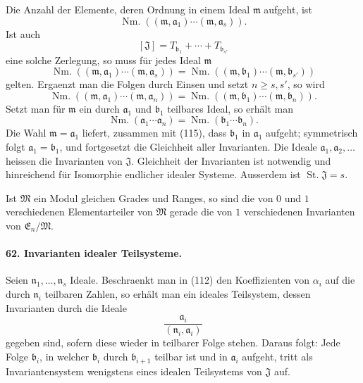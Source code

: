\documentclass[11pt]{article}
\newcommand{\St}{\operatorname{St.}}
\newcommand{\Nm}{\operatorname{Nm.}}
\begin{document}
Die Anzahl der Elemente, deren Ordnung in einem Ideal $\mathfrak m$ aufgeht, ist
\[
  \Nm((\mathfrak m,\mathfrak a_1)\cdots(\mathfrak m,\mathfrak a_s)).
\]
Ist auch
\[
  [\mathfrak J]=T_{\mathfrak b_1}+\cdots+T_{\mathfrak b_{s'}}
\]
eine solche Zerlegung, so muss für jedes Ideal $\mathfrak m$
\begin{equation}
  \Nm((\mathfrak m,\mathfrak a_1)\cdots(\mathfrak m,\mathfrak a_s))
  =
  \Nm((\mathfrak m,\mathfrak b_1)\cdots(\mathfrak m,\mathfrak b_{s'}))
\tag{113}
\end{equation}
gelten. Ergaenzt man die Folgen durch Einsen und setzt $n\ge s,s'$, so wird
\begin{equation}
  \Nm((\mathfrak m,\mathfrak a_1)\cdots(\mathfrak m,\mathfrak a_n))
  =
  \Nm((\mathfrak m,\mathfrak b_1)\cdots(\mathfrak m,\mathfrak b_n)).
\tag{114}
\end{equation}
Setzt man für $\mathfrak m$ ein durch $\mathfrak a_1$ und $\mathfrak b_1$ teilbares Ideal, so erhält man
\begin{equation}
  \Nm(\mathfrak a_1\cdots\mathfrak a_n)
  =
  \Nm(\mathfrak b_1\cdots\mathfrak b_n).
\tag{115}
\end{equation}
Die Wahl $\mathfrak m=\mathfrak a_1$ liefert, zusammen mit (115), dass $\mathfrak b_1$ in $\mathfrak a_1$ aufgeht; symmetrisch folgt $\mathfrak a_1=\mathfrak b_1$, und fortgesetzt die Gleichheit aller Invarianten. Die Ideale $\mathfrak a_1,\mathfrak a_2,
\ldots$ heissen die Invarianten von $\mathfrak J$. Gleichheit der Invarianten ist notwendig und hinreichend für Isomorphie endlicher idealer Systeme. Ausserdem ist $\St\mathfrak J=s$.

Ist $\mathfrak M$ ein Modul gleichen Grades und Ranges, so sind die von $0$ und $1$ verschiedenen Elementarteiler von $\mathfrak M$ gerade die von $1$ verschiedenen Invarianten von $\mathfrak E_n/\mathfrak M$.

\paragraph{62. Invarianten idealer Teilsysteme.}
Seien $\mathfrak n_1,
\ldots,
\mathfrak n_s$ Ideale. Beschraenkt man in (112) den Koeffizienten von $\alpha_i$ auf die durch $\mathfrak n_i$ teilbaren Zahlen, so erhält man ein ideales Teilsystem, dessen Invarianten durch die Ideale
\[
  \frac{\mathfrak a_i}{(\mathfrak n_i,\mathfrak a_i)}
\]
gegeben sind, sofern diese wieder in teilbarer Folge stehen. Daraus folgt: Jede Folge $\mathfrak b_i$, in welcher $\mathfrak b_i$ durch $\mathfrak b_{i+1}$ teilbar ist und in $\mathfrak a_i$ aufgeht, tritt als Invariantensystem wenigstens eines idealen Teilsystems von $\mathfrak J$ auf.
\end{document}
